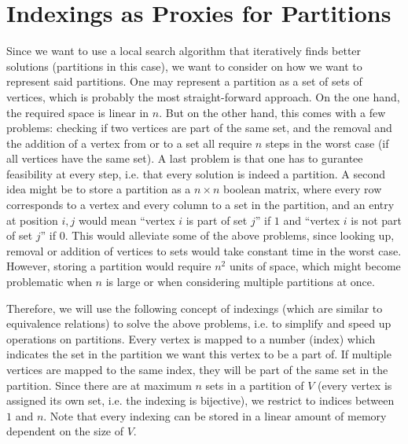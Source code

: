 \section{Indexings as Proxies for Partitions}
Since we want to use a local search algorithm that iteratively finds better solutions (partitions in this case), we want to consider on how we want to represent said partitions. One may represent a partition as a set of sets of vertices, which is probably the most straight-forward approach. On the one hand, the required space is linear in $n$. But on the other hand, this comes with a few problems: checking if two vertices are part of the same set, and the removal and the addition of a vertex from or to a set all require $n$ steps in the worst case (if all vertices have the same set). A last problem is that one has to gurantee feasibility at every step, i.e. that every solution is indeed a partition. A second idea might be to store a partition as a $n \times n$ boolean matrix, where every row corresponds to a vertex and every column to a set in the partition, and an entry at position $i,j$ would mean ``vertex $i$ is part of set $j$'' if $1$ and ``vertex $i$ is not part of set $j$'' if $0$. This would alleviate some of the above problems, since looking up, removal or addition of vertices to sets would take constant time in the worst case. However, storing a partition would require $n^2$ units of space, which might become problematic when $n$ is large or when considering multiple partitions at once.

Therefore, we will use the following concept of indexings (which are similar to equivalence relations) to solve the above problems, i.e. to simplify and speed up operations on partitions. Every vertex is mapped to a number (index) which indicates the set in the partition we want this vertex to be a part of. If multiple vertices are mapped to the same index, they will be part of the same set in the partition. Since there are at maximum $n$ sets in a partition of $V$ (every vertex is assigned its own set, i.e. the indexing is bijective), we restrict to indices between $1$ and $n$. Note that every indexing can be stored in a linear amount of memory dependent on the size of $V$.


